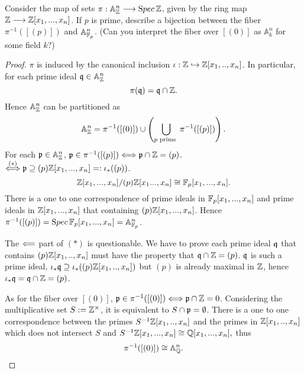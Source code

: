 \documentclass[11pt,fleqn]{book}
\begin{document}
\begin{exr}
Consider the map of sets $\pi: \mathbb{A}^n_\mathbb Z \longrightarrow  {\text Spec\,} \mathbb Z$,
given by the ring map $\mathbb Z \longrightarrow \mathbb Z[x_1,..., x_n]$. If $p$ is prime, describe a bijection between the fiber $\pi^{-1}([(p)])$ and $\mathbb{A}^n_{\mathbb F_p}$.
(Can you interpret the fiber over $[(0)]$ as $\mathbb{A}^n_{k}$ for some field $k$?)
\end{exr}
\begin{proof}
$\pi$ is induced by the canonical inclusion $\iota:\mathbb Z\hookrightarrow \mathbb Z[x_1,..,x_n]$. In particular, for each prime ideal $\mathfrak q\in \mathbb{A}^n_\mathbb Z$
$$
\pi(\mathfrak q)=\mathfrak q\cap\mathbb Z.
$$
Hence $\mathbb{A}^{n}_\mathbb Z$ can be partitioned as 
$$\mathbb{A}^n_\mathbb Z
=\pi^{-1}([(0)])\cup \left(\bigcup_{p\text{ prime }}\pi^{-1}([(p)])\right).
$$
For each ${\mathfrak p}\in \mathbb{A}^n_\mathbb Z$, ${\mathfrak p}\in \pi^{-1}([(p)])\Longleftrightarrow {\mathfrak p}\cap\mathbb Z=(p)$.\\
$\overset{(*)}{\Longleftrightarrow}{\mathfrak p}\supseteq (p)\mathbb Z[x_1,...,x_n]=:\iota_*((p))$.
$$
\mathbb Z[x_1,...,x_n]/(p)\mathbb Z[x_1...,x_n]\cong \mathbb F_p[x_1,...,x_n].
$$
There is a one to one correspondence of prime ideals in $\mathbb F_p[x_1,...,x_n]$ and prime ideals in $\mathbb Z[x_1,...,x_n]$ that containing $(p)\mathbb Z[x_1,...,x_n]$. Hence $\pi^{-1}([(p)])={\text Spec\,} \mathbb F_p[x_1,...,x_n]=\mathbb A_{\mathbb F_p}^n$.

The $\Longleftarrow$ part of $(*)$ is questionable. We have to prove each prime ideal $\mathfrak q$ that contains $(p)\mathbb Z[x_1,..,x_n]$ must have the property that $\mathfrak q\cap\mathbb Z=(p)$. $\mathfrak q$ is such a prime ideal, $\iota_*\mathfrak q\supseteq\iota_*((p)\mathbb Z[x_1,..,x_n])$ but $(p)$ is already maximal in $\mathbb Z$, hence $\iota_*\mathfrak q=\mathfrak q\cap\mathbb Z=(p)$.

As for the fiber over $[(0)]$, ${\mathfrak p}\in\pi^{-1}([(0)])\Longleftrightarrow {\mathfrak p}\cap \mathbb Z=0$.
 Considering the multiplicative set $S:=\mathbb Z^\times$, it is equivalent to $S\cap{\mathfrak p}=\emptyset$. There is a one to one correspondence between the primes $S^{-1}\mathbb Z[x_1,..,x_n]$ and the primes in $\mathbb Z[x_1,..,x_n]$ which does not intersect $S$ and 
 $
S^{-1}\mathbb Z[x_1,...,x_n]\cong \mathbb Q[x_1,...,x_n],
 $   
 thus 
 $$
\pi^{-1}([(0)])\cong \mathbb A^n_\mathbb Q.
 $$

\end{proof}
\end{document}
